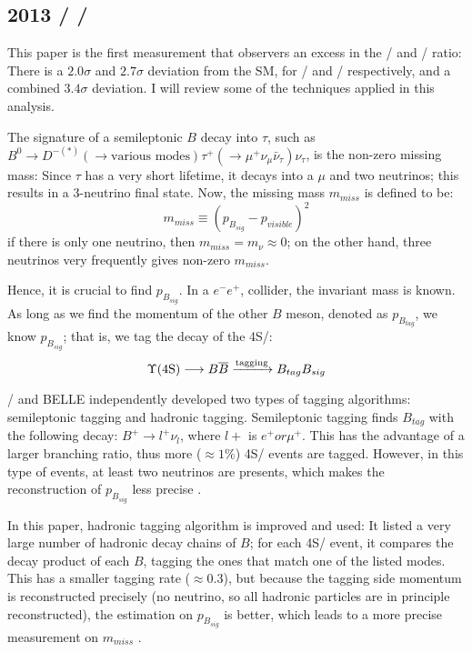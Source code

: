 \subsection{2013 \BaBar/ \RDDst/}
This paper \cite{Lees:2013uzd} is the first measurement that observers an excess
in the \RD/ and \RDst/ ratio:
There is a $2.0 \sigma$ and $2.7 \sigma$ deviation from the SM, for \RD/ and
\RDst/ respectively, and a combined $3.4 \sigma$ deviation.
I will review some of the techniques applied in this analysis.

The signature of a semileptonic $B$ decay into $\tau$, such as
$B^0 \longrightarrow D^{-(*)} (\longrightarrow \text{various modes})
\tau^+ (\longrightarrow \mu^+ \nu_{\mu} \bar{\nu}_{\tau}) \nu_{\tau}$, is the
non-zero missing mass:
Since $\tau$ has a very short lifetime, it decays into a $\mu$ and two
neutrinos;
this results in a 3-neutrino final state.
Now, the missing mass $m_{miss}$ is defined to be:
\begin{equation*}
    m_{miss} \equiv \left(p_{B_{sig}} - p_{visible}\right)^2
\end{equation*}
if there is only one neutrino, then $m_{miss} = m_{\nu} \approx 0$;
on the other hand, three neutrinos very frequently gives non-zero $m_{miss}$.

Hence, it is crucial to find $p_{B_{sig}}$.
In a $e^- e^+$, collider, the invariant mass is known.
As long as we find the momentum of the other $B$ meson, denoted as
$p_{B_{tag}}$, we know $p_{B_{sig}}$;
that is, we tag the decay of the \Y4S/:
\begin{equation*}
    \Y4S/ \longrightarrow B \overline{B} \xrightarrow{\text{tagging}}
        B_{tag} B_{sig}
\end{equation*}

\BaBar/ and BELLE independently developed two types of tagging algorithms:
semileptonic tagging and hadronic tagging.
Semileptonic tagging finds $B_{tag}$ with the following decay:
$B^+ \longrightarrow l^+ \nu_l$, where $l+$ is $e^+ or \mu^+$.
This has the advantage of a larger branching ratio, thus more ($\approx 1\%$)
\Y4S/ events are tagged.
However, in this type of events, at least two neutrinos are presents, which
makes the reconstruction of $p_{B_{sig}}$ less precise \cite{Ciezarek:2017yzh}.

In this paper, hadronic tagging algorithm is improved and used:
It listed a very large number of hadronic decay chains of $B$;
for each \Y4S/ event, it compares the decay product of each $B$, tagging the
ones that match one of the listed modes.
This has a smaller tagging rate ($\approx 0.3$), but because the tagging side
momentum is reconstructed precisely (no neutrino, so all hadronic particles are
in principle reconstructed), the estimation on $p_{B_{sig}}$ is better, which
leads to a more precise measurement on
$m_{miss}$ \cite{Lees:2013uzd,Ciezarek:2017yzh}.


